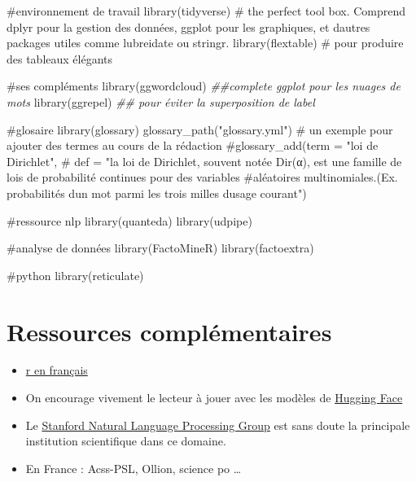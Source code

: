 \documentclass[
  letterpaper,
  DIV=11,
  numbers=noendperiod]{scrreprt}
\newenvironment{Shaded}{\begin{snugshade}}{\end{snugshade}}
\newcommand{\CommentTok}[1]{\textcolor[rgb]{0.37,0.37,0.37}{#1}}
\newcommand{\DocumentationTok}[1]{\textcolor[rgb]{0.37,0.37,0.37}{\textit{#1}}}
\newcommand{\FunctionTok}[1]{\textcolor[rgb]{0.28,0.35,0.67}{#1}}
\newcommand{\NormalTok}[1]{\textcolor[rgb]{0.00,0.23,0.31}{#1}}
\newcommand{\StringTok}[1]{\textcolor[rgb]{0.13,0.47,0.30}{#1}}
\providecommand{\tightlist}{%
  \setlength{\itemsep}{0pt}\setlength{\parskip}{0pt}}\usepackage{longtable,booktabs,array}
\begin{document}
\begin{Shaded}
\begin{Highlighting}[]
\CommentTok{\#environnement de travail}
\FunctionTok{library}\NormalTok{(tidyverse) }\CommentTok{\# the perfect tool box. Comprend dplyr pour la gestion des données, ggplot pour les graphiques, et d\textquotesingle{}autres packages utiles comme lubreidate ou stringr.}
\FunctionTok{library}\NormalTok{(flextable) }\CommentTok{\# pour produire des tableaux élégants}

\CommentTok{\#ses compléments  }
\FunctionTok{library}\NormalTok{(ggwordcloud) }\DocumentationTok{\#\#complete ggplot pour les nuages de mots}
\FunctionTok{library}\NormalTok{(ggrepel) }\DocumentationTok{\#\# pour éviter la superposition de label}

\CommentTok{\#glosaire }
\FunctionTok{library}\NormalTok{(glossary)}
\FunctionTok{glossary\_path}\NormalTok{(}\StringTok{"glossary.yml"}\NormalTok{)}
\CommentTok{\# un exemple pour ajouter des termes au cours de la rédaction}
\CommentTok{\#glossary\_add(term = "loi de Dirichlet",}
\CommentTok{\#             def = "la loi de Dirichlet, souvent notée Dir(α), est une famille de lois de probabilité continues pour des variables \#aléatoires multinomiales.(Ex. probabilités d\textquotesingle{}un mot parmi les trois milles d\textquotesingle{}usage courant")}

\CommentTok{\#ressource nlp  }
\FunctionTok{library}\NormalTok{(quanteda) }
\FunctionTok{library}\NormalTok{(udpipe)}

\CommentTok{\#analyse de données}
\FunctionTok{library}\NormalTok{(FactoMineR)}
\FunctionTok{library}\NormalTok{(factoextra)}

\CommentTok{\#python}
\FunctionTok{library}\NormalTok{(reticulate)}
\end{Highlighting}
\end{Shaded}

\section*{Ressources
complémentaires}\label{ressources-compluxe9mentaires}


\begin{itemize}
\tightlist
\item
  \href{https://larmarange.github.io/analyse-R/}{r en français}
\item
  On encourage vivement le lecteur à jouer avec les modèles de
  \href{https://huggingface.co/models}{Hugging Face}
\item
  Le \href{https://nlp.stanford.edu/}{Stanford Natural Language
  Processing Group} est sans doute la principale institution
  scientifique dans ce domaine.
\item
  En France : Acss-PSL, Ollion, science po \ldots{}
\end{itemize}
\end{document}
